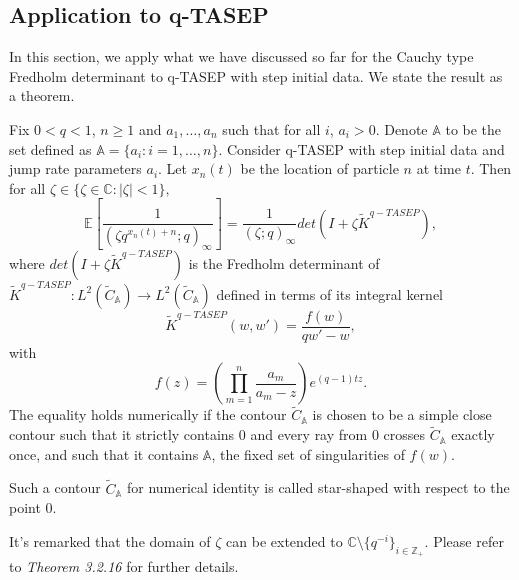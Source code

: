 \subsection{Application to q-TASEP}
In this section, we apply what we have discussed so far for the Cauchy type Fredholm determinant to q-TASEP with step initial data. We state the result as a theorem.

\begin{theorem}
\label{cauchy-type-application-to-qtasep}
Fix $0 < q<1$, $n \ge 1$ and $a_1, \dots, a_n$ such that for all $i$, $a_i > 0$. Denote $\mathbb{A}$ to be the set defined as $\mathbb{A} = \{a_i: i = 1, \dots, n\}$. Consider q-TASEP with step initial data and jump rate parameters $a_i$. Let $x_n(t)$ be the location of particle $n$ at time $t$. Then for all $\zeta \in \{ \zeta \in \mathbb{C}: |\zeta| < 1 \},$ $$\mathbb{E} \left[ \frac{1}{(\zeta q^{x_n(t) + n}; q)_{\infty}} \right] = \frac{1}{(\zeta; q)_{\infty}} det(I + \zeta \tilde{K}^{q-TASEP}),$$ where $det(I + \zeta \tilde{K}^{q-TASEP})$ is the Fredholm determinant of $\tilde{K}^{q-TASEP}: L^2(\tilde{C}_{\mathbb{A}}) \rightarrow  L^2(\tilde{C}_{\mathbb{A}})$ defined in terms of its integral kernel $$\tilde{K}^{q-TASEP}(w,w') = \frac{f(w)}{qw' - w},$$ with $$f(z) = \left( \prod_{m=1}^{n} \frac{a_m}{a_m - z} \right) e^{(q-1)tz}.$$ 
The equality holds numerically if the contour $\tilde{C}_{\mathbb{A}}$ is chosen to be a simple close contour such that it strictly contains $0$ and every ray from $0$ crosses $\tilde{C}_{\mathbb{A}}$ exactly once, and such that it contains $\mathbb{A}$, the fixed set of singularities of $f(w)$.
\end{theorem}

\begin{remark}
Such a contour $\tilde{C}_{\mathbb{A}}$ for numerical identity is called star-shaped with respect to the point $0$.
\end{remark}

\begin{remark}
It's remarked that the domain of $\zeta$ can be extended to $\mathbb{C} \setminus \{q^{-i}\}_{i \in \mathbb{Z}_+}$. Please refer to \cite{macdonald2014} \textit{Theorem 3.2.16} for further details.
\end{remark}

